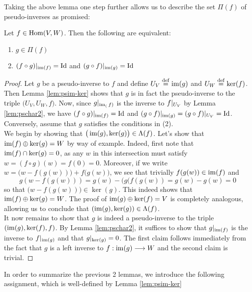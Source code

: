 Taking the above lemma one step further allows us to describe the set $\Pi(f)$ of pseudo-inverses as promised:

\begin{lemma}\label{lem:charpi}
	Let $f \in \operatorname{Hom}(V,W)$. Then the following are equivalent:
	\begin{enumerate}
	\item $g \in \Pi(f)$
	\item $(f\circ g)\arrowvert_{\operatorname{im}(f)}=\operatorname{Id}$ and $(g\circ f)\arrowvert_{\operatorname{im}(g)}=\operatorname{Id}$ 
	\end{enumerate}
\end{lemma}

\begin{proof}
	Let $g$ be a pseudo-inverse to $f$ and define $U_V\stackrel{\operatorname{def}}{=}\operatorname{im}(g)$ and $U_W\stackrel{\operatorname{def}}{=}\ker(f)$. Then Lemma \ref{lem:psim-ker} shows that $g$ is in fact the pseudo-inverse to the triple $\big(U_V,U_W,f\big)$. Now, since $g\arrowvert_{\operatorname{im}_(f)}$ is the inverse to $f\arrowvert_{U_V}$ by Lemma \ref{lem:pschar2}, we have $(f \circ g)\arrowvert_{\operatorname{im}(f)}=\operatorname{Id}$ and $(g \circ f)\arrowvert_{\operatorname{im}(g)}=(g \circ f)\arrowvert_{U_V}=\operatorname{Id}$.\\
	Conversely, assume that $g$ satisfies the conditions in (2).\\
	We begin by showing that $\big(\operatorname{im}(g),\ker(g)\big) \in \Lambda(f)$. Let's show  that $\operatorname{im}(f)\oplus \ker(g)=W$ by way of example. Indeed, first note that $\operatorname{im}(f)\cap \ker(g)=0$, as any $w$ in this intersection must satisfy $w=(f\circ g)(w)=f(0)=0$. Moreover, if we write $w=\big(w-f( g(w))\big)+f ( g(w)\big)$, we see that trivially $f(g(w))\in \operatorname{im} (f)$ and \[
	g(w-f(g(w)))=g(w)-(g(f(g(w))=g(w)-g(w)=0
	\]
	so that $\big(w-f(g(w))\big) \in \ker(g)$. This indeed shows that $\operatorname{im}(f)\oplus \ker(g)=W$. The proof of $\operatorname{im}(g)\oplus \ker(f)=V$ is completely analogous, allowing us to conclude that $(\operatorname{im}(g),\ker(g))\in \Lambda(f)$.\\
	It now remains to show that $g$ is indeed a pseudo-inverse to the triple $(\operatorname{im}(g),\ker(f),f)$. By Lemma \ref{lem:pschar2}, it suffices to show that $g\arrowvert_{\operatorname{im}(f)}$ is the inverse to $f\arrowvert_{\operatorname{im}(g)}$ and that $g\arrowvert_{\ker(g)}=0$. The first claim follows immediately from the fact that $g$ is a left inverse to $f:\operatorname{im}(g)\longrightarrow W$ and the second claim is trivial.
\end{proof}

\noindent In order to summarize the previous 2 lemmas, we introduce the following assignment, which is well-defined by Lemma \ref{lem:psim-ker}

